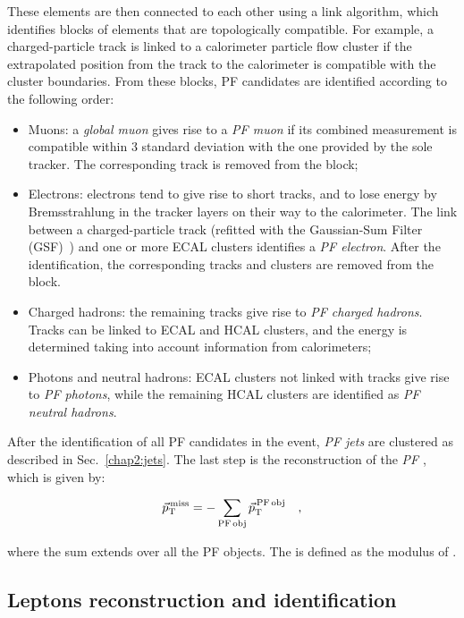 These elements are then connected to each other using a link algorithm, which identifies blocks of elements that are topologically compatible. For example, a charged-particle track is linked to a calorimeter particle flow cluster if the extrapolated position from the track to the calorimeter is compatible with the cluster boundaries. From these blocks, PF candidates are identified according to the following order:
\begin{itemize}
\item Muons: a \emph{global muon} gives rise to a \emph{PF muon} if its combined \pt measurement is compatible within 3 standard deviation with the one provided by the sole tracker. The corresponding track is removed from the block;
\item Electrons: electrons tend to give rise to short tracks, and to lose energy by Bremsstrahlung in the tracker layers on their way to the calorimeter. The link between a charged-particle track (refitted with the Gaussian-Sum Filter (GSF)~\cite{Adam:815410}) and one or more ECAL clusters identifies a \emph{PF electron}. After the identification, the corresponding tracks and clusters are removed from the block.
\item Charged hadrons: the remaining tracks give rise to \emph{PF charged hadrons}. Tracks can be linked to ECAL and HCAL clusters, and the energy is determined taking into account information from calorimeters;
\item Photons and neutral hadrons: ECAL clusters not linked with tracks give rise to \emph{PF photons}, while the remaining HCAL clusters are identified as \emph{PF neutral hadrons}.
\end{itemize}
After the identification of all PF candidates in the event, \emph{PF jets} are clustered as described in Sec.~\ref{chap2:jets}. The last step is the reconstruction of the \emph{PF \ptmiss}, which is given by:

\begin{equation} 
\vec{p}_\mathrm{T}^\mathrm{\,miss} = - \sum_{\mathrm{PF\,obj}} \vec{p}_\mathrm{T}^\mathrm{\,PF\,obj} \quad,
\end{equation}

where the sum extends over all the PF objects. The \MET is defined as the modulus of \ptmiss.

\subsection{Leptons reconstruction and identification}


